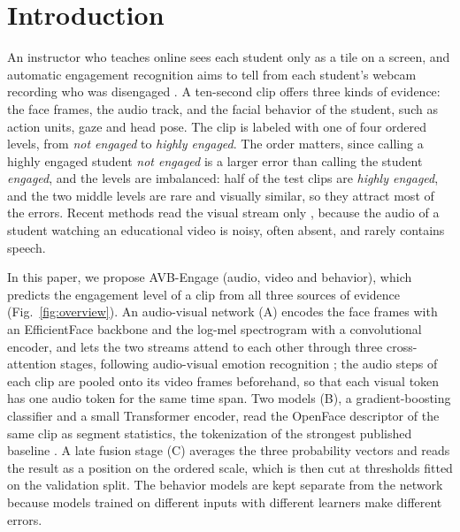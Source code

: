 \documentclass[pdflatex,iicol,sn-basic]{sn-jnl}
\newcommand{\ournet}{AVB-Engage}
\begin{document}
\section{Introduction}\label{sec:intro}

An instructor who teaches online sees each student only as a tile on a screen, and automatic engagement recognition aims to tell from each student's webcam recording who was disengaged \citep{qarbal2025review,mandia2023review}. A ten-second clip offers three kinds of evidence: the face frames, the audio track, and the facial behavior of the student, such as action units, gaze and head pose. The clip is labeled with one of four ordered levels, from \emph{not engaged} to \emph{highly engaged}. The order matters, since calling a highly engaged student \emph{not engaged} is a larger error than calling the student \emph{engaged}, and the levels are imbalanced: half of the test clips are \emph{highly engaged}, and the two middle levels are rare and visually similar, so they attract most of the errors. Recent methods read the visual stream only \citep{singh2023engagenet,vedernikov2024tcct,abedi2024stgcn,vedernikov2026priornet,augusma2026vemd}, because the audio of a student watching an educational video is noisy, often absent, and rarely contains speech.

In this paper, we propose \ournet{} (audio, video and behavior), which predicts the engagement level of a clip from all three sources of evidence (Fig.~\ref{fig:overview}). An audio-visual network (A) encodes the face frames with an EfficientFace backbone \citep{zhao2021efficientface} and the log-mel spectrogram with a convolutional encoder, and lets the two streams attend to each other through three cross-attention stages, following audio-visual emotion recognition \citep{chumachenko2022selfattention,venkatraman2025avtca}; the audio steps of each clip are pooled onto its video frames beforehand, so that each visual token has one audio token for the same time span. Two models (B), a gradient-boosting classifier and a small Transformer encoder, read the OpenFace descriptor of the same clip as segment statistics, the tokenization of the strongest published baseline \citep{singh2023engagenet}. A late fusion stage (C) averages the three probability vectors and reads the result as a position on the ordered scale, which is then cut at thresholds fitted on the validation split. The behavior models are kept separate from the network because models trained on different inputs with different learners make different errors.
\end{document}
